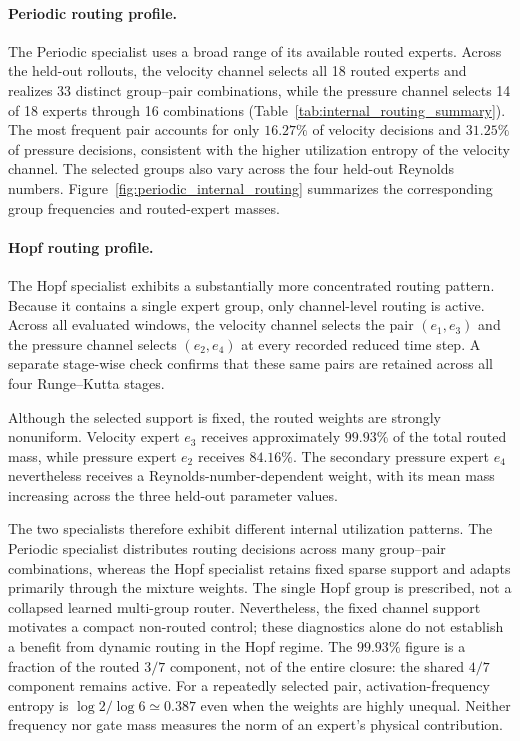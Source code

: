 \documentclass{article}
\begin{document}
\paragraph{Periodic routing profile.}
The Periodic specialist uses a broad range of its available routed experts. Across the held-out rollouts, the velocity channel selects all 18 routed experts and realizes 33 distinct group--pair combinations, while the pressure channel selects 14 of 18 experts through 16 combinations (Table~\ref{tab:internal_routing_summary}). The most frequent pair accounts for only $16.27\%$ of velocity decisions and $31.25\%$ of pressure decisions, consistent with the higher utilization entropy of the velocity channel. The selected groups also vary across the four held-out Reynolds numbers.
Figure~\ref{fig:periodic_internal_routing} summarizes the corresponding group frequencies and routed-expert masses.



\paragraph{Hopf routing profile.}
The Hopf specialist exhibits a substantially more concentrated routing pattern. Because it contains a single expert group, only channel-level routing is active. Across all evaluated windows, the velocity channel selects the pair
$(e_1,e_3)$ and the pressure channel selects $(e_2,e_4)$ at every recorded reduced time step. A separate stage-wise check confirms that these same pairs are retained across all four Runge--Kutta stages.

Although the selected support is fixed, the routed weights are strongly nonuniform. Velocity expert $e_3$ receives approximately $99.93\%$ of the total routed mass, while pressure expert $e_2$ receives $84.16\%$. The secondary pressure expert $e_4$ nevertheless receives a Reynolds-number-dependent weight, with its mean mass increasing across the three held-out parameter values.

The two specialists therefore exhibit different internal utilization patterns. The Periodic specialist distributes routing decisions across many group--pair combinations, whereas the Hopf specialist retains fixed sparse support and adapts primarily through the mixture weights. The single Hopf group is prescribed, not a collapsed learned multi-group router. Nevertheless, the fixed channel support motivates a compact non-routed control; these diagnostics alone do not establish a benefit from dynamic routing in the Hopf regime. The $99.93\%$ figure is a fraction of the routed $3/7$ component, not of the entire closure: the shared $4/7$ component remains active. For a repeatedly selected pair, activation-frequency entropy is $\log 2/\log 6\simeq0.387$ even when the weights are highly unequal. Neither frequency nor gate mass measures the norm of an expert's physical contribution.
\end{document}
